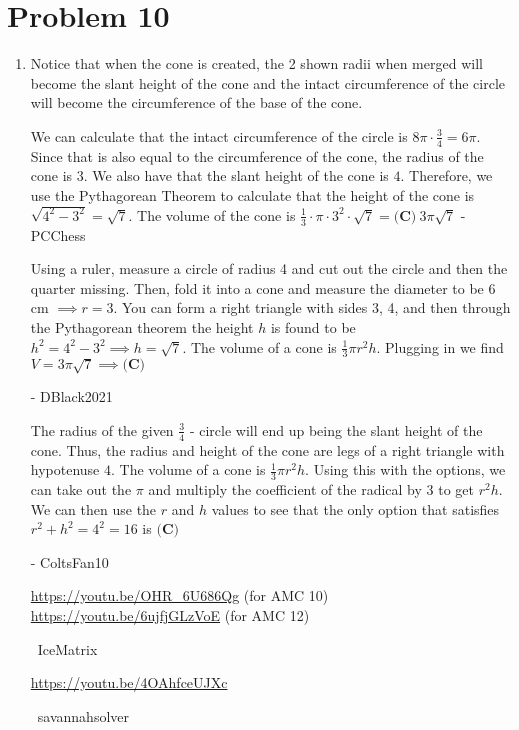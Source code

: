 \documentclass{article}%
\begin{document}
\section*{Problem 10}%
\label{sec:Problem10}%
\begin{enumerate}%
\item%
Notice that when the cone is created, the 2 shown radii when merged will become the slant height of the cone and the intact circumference of the circle will become the circumference of the base of the cone. 

We can calculate that the intact circumference of the circle is $8\pi\cdot\frac{3}{4}=6\pi$. Since that is also equal to the circumference of the cone, the radius of the cone is $3$. We also have that the slant height of the cone is $4$. Therefore, we use the Pythagorean Theorem to calculate that the height of the cone is $\sqrt{4^2-3^2}=\sqrt7$. The volume of the cone is $\frac{1}{3}\cdot\pi\cdot3^2\cdot\sqrt7=\boxed{\textbf{(C)}\ 3 \pi \sqrt7 }$ -PCChess

Using a ruler, measure a circle of radius 4 and cut out the circle and then the quarter missing. Then, fold it into a cone and measure the diameter to be 6 cm $\implies r=3$. You can form a right triangle with sides 3, 4, and then through the Pythagorean theorem the height $h$ is found to be $h^2 = 4^{2} - 3^{2} \implies h = \sqrt{7}$. The volume of a cone is $\frac{1}{3}\pi r^{2}h$. Plugging in we find $V = 3\pi \sqrt{7} \implies \boxed{\textbf{(C)}}$

- DBlack2021

The radius of the given $\frac{3}{4}$ - circle will end up being the slant height of the cone. Thus, the radius and height of the cone are legs of a right triangle with hypotenuse $4$. The volume of a cone is $\frac{1}{3}\pi r^{2}h$. Using this with the options, we can take out the $\pi$ and multiply the coefficient of the radical by $3$ to get $r^{2}h$. We can then use the $r$ and $h$ values to see that the only option that satisfies $r^2+h^2=4^2=16$ is $\boxed{\textbf{(C)}}$

- ColtsFan10

\href{https://youtu.be/OHR_6U686Qg}{https://youtu.be/OHR\_6U686Qg} (for AMC 10)
\href{https://youtu.be/6ujfjGLzVoE}{https://youtu.be/6ujfjGLzVoE} (for AMC 12)

~IceMatrix

\href{https://youtu.be/4OAhfceUJXc}{https://youtu.be/4OAhfceUJXc}

~savannahsolver

%
\end{enumerate}
\end{document}
